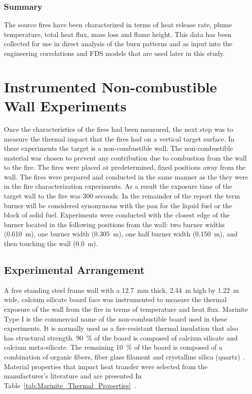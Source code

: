 \documentclass[twoside]{uocthesis}
\begin{document}
{\subsection{Summary}

The source fires have been characterized in terms of heat release rate, plume temperature, total heat flux, mass loss and flame height.  This data has been collected for use in direct analysis of the burn patterns and as input into the engineering correlations and FDS models that are used later in this study.



\chapter{Instrumented Non-combustible Wall Experiments}

Once the characteristics of the fires had been measured, the next step was to measure the thermal impact that the fires had on a vertical target surface.  In these experiments the target is a non-combustible wall. The non-combustible material was chosen to prevent any contribution due to combustion from the wall to the fire.  The fires were placed at predetermined, fixed positions away from the wall. The fires were prepared and conducted in the same manner as the they were in the fire characterization experiments. As a result the exposure time of the target wall to the fire was 300 seconds. In the remainder of the report the term burner will be considered synonymous with the pan for the liquid fuel or the block of solid fuel. Experiments were conducted with the closest edge of the burner located in the following positions from the wall: two burner widths (0.610~m), one burner width (0.305~m), one half burner width (0.150~m), and then touching the wall (0.0~m).


\section{Experimental Arrangement}

A free standing steel frame wall with a 12.7~mm thick, 2.44~m high by 1.22~m wide, calcium silicate board face was instrumented to measure the thermal exposure of the wall from the fire in terms of temperature and heat flux. Marinite Type I is the commercial name of the non-combustible board used in these experiments.  It is normally used as a fire-resistant thermal insulation that also has structural strength. 90~\% of the board is composed of calcium silicate and calcium meta-silicate.  The remaining 10~\% of the board is composed of a combination of organic fibers, fiber glass filament and crystalline silica (quartz)~\cite{BNZ:MSDS}.  Material properties that impact heat transfer were selected from the manufacturer's literature and are presented In Table~\ref{tab:Marinite_Thermal_Properties}~\cite{Marinite:1997}.

}
\end{document}
